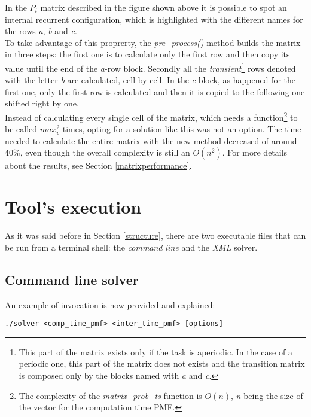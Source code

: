 In the \( P_{i} \) matrix described in the figure shown above it is possible to spot an internal recurrent configuration, which is highlighted with the different names for the rows \emph{a}, \emph{b} and \emph{c}.\\
To take advantage of this proprerty, the \emph{pre\_process()} method builds the matrix in three steps: the first one is to calculate only the first row and then copy its value until the end of the \emph{a}-row block. Secondly all the \emph{transient}\footnote{This part of the matrix exists only if the task is aperiodic. In the case of a periodic one, this part of the matrix does not exists and the transition matrix is composed only by the blocks named with \emph{a} and \emph{c}.} rows denoted with the letter \emph{b} are calculated, cell by cell. In the \emph{c} block, as happened for the first one, only the first row is calculated and then it is copied to the following one shifted right by one.\\
Instead of calculating every single cell of the matrix, which needs a function\footnote{The complexity of the \emph{matrix\_prob\_ts} function is \( O(n) \), \emph{n} being the size of the vector for the computation time PMF.} to be called \( max_{v}^{2} \) times, opting for a solution like this was not an option. The time needed to calculate the entire matrix with the new method decreased of around 40\%, even though the overall complexity is still an \( O(n^{2}) \). For more details about the results, see Section \ref{matrixperformance}.

\section{Tool's execution}
As it was said before in Section \ref{structure}, there are two executable files that can be run from a terminal shell: the \emph{command line} and the \emph{XML} solver.

\subsection{Command line solver}
An example of invocation is now provided and explained:
\begin{lstlisting}[frame=bt, numbers=none]
  ./solver <comp_time_pmf> <inter_time_pmf> [options]
\end{lstlisting}    

